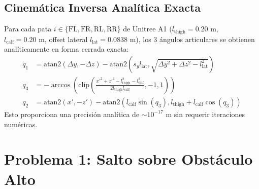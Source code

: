 \documentclass[11pt,a4paper]{article}
\begin{document}
\subsection{Cinemática Inversa Analítica Exacta}
Para cada pata $i \in \{\text{FL}, \text{FR}, \text{RL}, \text{RR}\}$ de Unitree A1 ($l_{\text{thigh}} = 0.20\text{ m}$, $l_{\text{calf}} = 0.20\text{ m}$, offset lateral $l_{\text{lat}} = 0.0838\text{ m}$), los 3 ángulos articulares se obtienen analíticamente en forma cerrada exacta:
\begin{align}
q_1 &= \text{atan2}(\Delta y, -\Delta z) - \text{atan2}(s_y l_{\text{lat}}, \sqrt{\Delta y^2 + \Delta z^2 - l_{\text{lat}}^2}) \\
q_3 &= -\arccos\left( \text{clip}\left(\frac{x'^2 + z'^2 - l_{\text{thigh}}^2 - l_{\text{calf}}^2}{2 l_{\text{thigh}} l_{\text{calf}}}, -1, 1\right) \right) \\
q_2 &= \text{atan2}(x', -z') - \text{atan2}(l_{\text{calf}} \sin(q_3), l_{\text{thigh}} + l_{\text{calf}} \cos(q_3))
\end{align}
Esto proporciona una precisión analítica de $\sim 10^{-17}\text{ m}$ sin requerir iteraciones numéricas.

\section{Problema 1: Salto sobre Obstáculo Alto}
\end{document}
